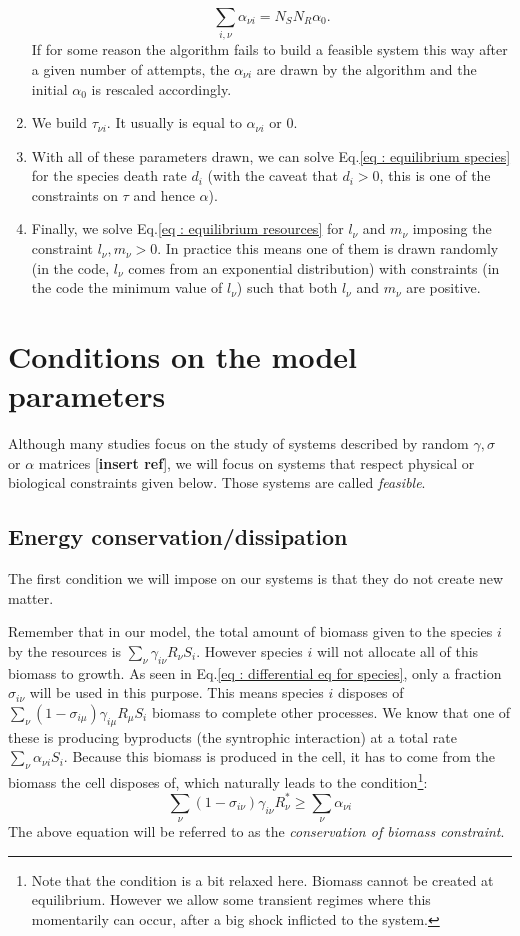 \documentclass[12pt, titlepage]{report}
\begin{document}
\begin{enumerate}
  \begin{equation}
    \sum_{i,\nu} \alpha_{\nu i} = N_S N_R \alpha_0.
  \end{equation}
  If for some reason the algorithm fails to build a feasible system this way after a given number of attempts, the $\alpha_{\nu i}$ are drawn by the algorithm and the initial $\alpha_0$ is rescaled accordingly.
  \item We build $\tau_{\nu i}$. It usually is equal to $\alpha_{\nu i}$ or 0.
  \item With all of these parameters drawn, we can solve Eq.\eqref{eq : equilibrium species} for the species death rate $d_i$ (with the caveat that $d_i > 0$, this is one of the constraints on $\tau$ and hence $\alpha$).
  \item Finally, we solve Eq.\eqref{eq : equilibrium resources} for $l_\nu$ and $m_\nu$ imposing the constraint $l_\nu, m_\nu > 0$. In practice this means one of them is drawn randomly (in the code, $l_\nu$ comes from an exponential distribution) with constraints (in the code the minimum value of $l_\nu$) such that both $l_\nu$ and $m_\nu$ are positive.
\end{enumerate}

\section{Conditions on the model parameters}
Although many studies focus on the study of systems described by random $\gamma, \sigma$ or $\alpha$ matrices [\textbf{insert ref}], we will focus on systems that respect physical or biological constraints given below. Those systems are called \textit{feasible}.
\subsection{Energy conservation/dissipation}
The first condition we will impose on our systems is that they do not create new matter.

Remember that in our model, the total amount of biomass given to the species $i$ by the resources is $\sum_\nu \gamma_{i\nu}R_\nu S_i$.
However species $i$ will not allocate all of this biomass to growth. As seen in Eq.\eqref{eq : differential eq for species}, only a fraction $\sigma_{i\nu}$ will be used in this purpose. This means species $i$ disposes of $\sum_\nu(1-\sigma_{i\mu})\gamma_{i\mu}R_\mu S_i$ biomass to complete other processes.
We know that one of these is producing byproducts (\ie the syntrophic interaction) at a total rate $\sum_\nu \alpha_{\nu i} S_i$. Because this biomass is produced in the cell, it has to come from the biomass the cell disposes of, which naturally leads to the condition\footnote{Note that the condition is a bit relaxed here. Biomass cannot be created at equilibrium. However we allow some transient regimes where this momentarily can occur, \eg after a big shock inflicted to the system.}:
  \begin{equation}
  \sum_{\nu} \left(1-\sigma_{i\nu}\right)\gamma_{i\nu}R^*_\nu \geq \sum_\nu \alpha_{\nu i} \label{eq : dissipation constraint}
\end{equation}
The above equation will be referred to as the \textit{conservation of biomass constraint}.
\end{document}
